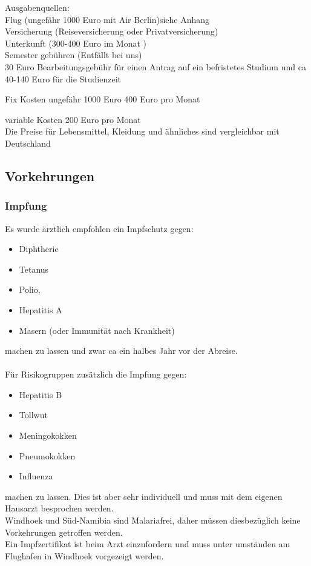 \documentclass[11pt]{article}
\begin{document}
Ausgabenquellen:\\
Flug (ungefähr 1000 Euro mit Air Berlin)siehe Anhang\\
Versicherung (Reiseversicherung oder Privatversicherung)\\
Unterkunft (300-400 Euro im Monat )\\
Semester gebühren (Entfällt bei uns)\\
30 Euro Bearbeitungsgebühr für einen Antrag auf ein befristetes Studium und ca 40-140 Euro für die Studienzeit

Fix Kosten 		ungefähr 1000 Euro
			400 Euro pro Monat

variable Kosten 	200 Euro pro Monat\\

Die Preise für Lebensmittel, Kleidung und ähnliches sind vergleichbar mit Deutschland

\subsection{Vorkehrungen}

\subsubsection{Impfung}
Es wurde ärztlich empfohlen ein Impfschutz gegen:
\begin{itemize}
\item Diphtherie
\item Tetanus
\item Polio,
\item Hepatitis A
\item Masern (oder Immunität nach Krankheit)
\end{itemize}
machen zu lassen und zwar ca ein halbes Jahr vor der 
Abreise. \\\\
Für Risikogruppen zusätzlich die Impfung gegen:
\begin{itemize}
\item Hepatitis B
\item Tollwut
\item Meningokokken
\item Pneumokokken
\item Influenza
\end{itemize}
 machen zu lassen. Dies ist aber sehr individuell und muss mit dem eigenen Hausarzt besprochen werden.
\\
Windhoek und Süd-Namibia sind Malariafrei, daher müssen diesbezüglich keine Vorkehrungen getroffen werden. 
\\
Ein Impfzertifikat ist beim Arzt einzufordern und muss unter umständen am Flughafen in Windhoek vorgezeigt werden.
\end{document}
